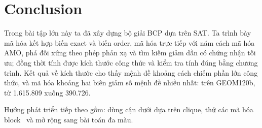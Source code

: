 \section{Conclusion}\label{sec:conclusion}

Trong bài tập lớn này ta đã xây dựng bộ giải BCP dựa trên SAT. Ta trình bày mã hóa kết hợp biến exact và biến order, mã hóa trực tiếp với năm cách mã hóa AMO, phá đối xứng theo phép phản xạ và tìm kiếm giảm dần có chứng nhận tối ưu; đồng thời tính được kích thước công thức và kiểm tra tính đúng bằng chương trình. Kết quả về kích thước cho thấy mệnh đề khoảng cách chiếm phần lớn công thức, và mã hóa khoảng hai biên giảm số mệnh đề nhiều nhất: trên GEOM120b, từ 1.615.809 xuống 390.726. \AutoConclusion

Hướng phát triển tiếp theo gồm: dùng cận dưới dựa trên clique, thử các mã hóa block~\citep{nguyen2026bcp} và mở rộng sang bài toán đa màu.
